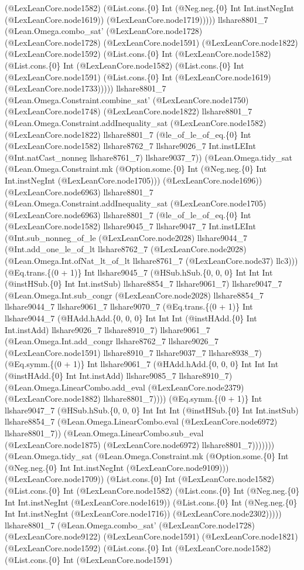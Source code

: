 \documentclass[11pt]{article}
\begin{document}
(@LexLeanCore.node1582) (@List.cons.\{0\} Int (@Neg.neg.\{0\} Int Int.instNegInt (@LexLeanCore.node1619)) (@LexLeanCore.node1719))))) llshare8801\_7 (@Lean.Omega.combo\_sat' (@LexLeanCore.node1728) (@LexLeanCore.node1728) (@LexLeanCore.node1591) (@LexLeanCore.node1822) (@LexLeanCore.node1592) (@List.cons.\{0\} Int (@LexLeanCore.node1582) (@List.cons.\{0\} Int (@LexLeanCore.node1582) (@List.cons.\{0\} Int (@LexLeanCore.node1591) (@List.cons.\{0\} Int (@LexLeanCore.node1619) (@LexLeanCore.node1733))))) llshare8801\_7 (@Lean.Omega.Constraint.combine\_sat' (@LexLeanCore.node1750) (@LexLeanCore.node1748) (@LexLeanCore.node1822) llshare8801\_7 (@Lean.Omega.Constraint.addInequality\_sat (@LexLeanCore.node1582) (@LexLeanCore.node1822) llshare8801\_7 (@le\_of\_le\_of\_eq.\{0\} Int (@LexLeanCore.node1582) llshare8762\_7 llshare9026\_7 Int.instLEInt (@Int.natCast\_nonneg llshare8761\_7) llshare9037\_7)) (@Lean.Omega.tidy\_sat (@Lean.Omega.Constraint.mk (@Option.some.\{0\} Int (@Neg.neg.\{0\} Int Int.instNegInt (@LexLeanCore.node1705))) (@LexLeanCore.node1696)) (@LexLeanCore.node6963) llshare8801\_7 (@Lean.Omega.Constraint.addInequality\_sat (@LexLeanCore.node1705) (@LexLeanCore.node6963) llshare8801\_7 (@le\_of\_le\_of\_eq.\{0\} Int (@LexLeanCore.node1582) llshare9045\_7 llshare9047\_7 Int.instLEInt (@Int.sub\_nonneg\_of\_le (@LexLeanCore.node2028) llshare9044\_7 (@Int.add\_one\_le\_of\_lt llshare8762\_7 (@LexLeanCore.node2028) (@Lean.Omega.Int.ofNat\_lt\_of\_lt llshare8761\_7 (@LexLeanCore.node37) llc3))) (@Eq.trans.\{(0 + 1)\} Int llshare9045\_7 (@HSub.hSub.\{0, 0, 0\} Int Int Int (@instHSub.\{0\} Int Int.instSub) llshare8854\_7 llshare9061\_7) llshare9047\_7 (@Lean.Omega.Int.sub\_congr (@LexLeanCore.node2028) llshare8854\_7 llshare9044\_7 llshare9061\_7 llshare9070\_7 (@Eq.trans.\{(0 + 1)\} Int llshare9044\_7 (@HAdd.hAdd.\{0, 0, 0\} Int Int Int (@instHAdd.\{0\} Int Int.instAdd) llshare9026\_7 llshare8910\_7) llshare9061\_7 (@Lean.Omega.Int.add\_congr llshare8762\_7 llshare9026\_7 (@LexLeanCore.node1591) llshare8910\_7 llshare9037\_7 llshare8938\_7) (@Eq.symm.\{(0 + 1)\} Int llshare9061\_7 (@HAdd.hAdd.\{0, 0, 0\} Int Int Int (@instHAdd.\{0\} Int Int.instAdd) llshare9085\_7 llshare8910\_7) (@Lean.Omega.LinearCombo.add\_eval (@LexLeanCore.node2379) (@LexLeanCore.node1882) llshare8801\_7)))) (@Eq.symm.\{(0 + 1)\} Int llshare9047\_7 (@HSub.hSub.\{0, 0, 0\} Int Int Int (@instHSub.\{0\} Int Int.instSub) llshare8854\_7 (@Lean.Omega.LinearCombo.eval (@LexLeanCore.node6972) llshare8801\_7)) (@Lean.Omega.LinearCombo.sub\_eval (@LexLeanCore.node1875) (@LexLeanCore.node6972) llshare8801\_7))))))) (@Lean.Omega.tidy\_sat (@Lean.Omega.Constraint.mk (@Option.some.\{0\} Int (@Neg.neg.\{0\} Int Int.instNegInt (@LexLeanCore.node9109))) (@LexLeanCore.node1709)) (@List.cons.\{0\} Int (@LexLeanCore.node1582) (@List.cons.\{0\} Int (@LexLeanCore.node1582) (@List.cons.\{0\} Int (@Neg.neg.\{0\} Int Int.instNegInt (@LexLeanCore.node1619)) (@List.cons.\{0\} Int (@Neg.neg.\{0\} Int Int.instNegInt (@LexLeanCore.node1716)) (@LexLeanCore.node2302))))) llshare8801\_7 (@Lean.Omega.combo\_sat' (@LexLeanCore.node1728) (@LexLeanCore.node9122) (@LexLeanCore.node1591) (@LexLeanCore.node1821) (@LexLeanCore.node1592) (@List.cons.\{0\} Int (@LexLeanCore.node1582) (@List.cons.\{0\} Int (@LexLeanCore.node1591) 
\end{document}
